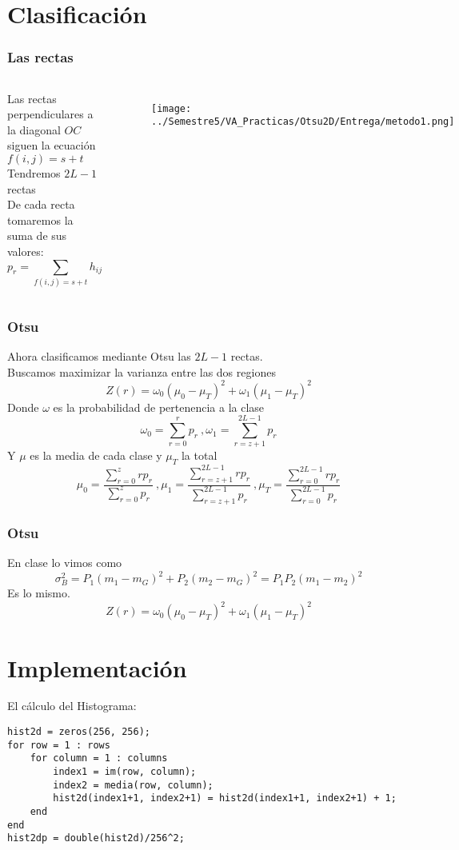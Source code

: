 \documentclass{beamer}
\begin{document}
\section{Clasificación}
\begin{frame}
\frametitle{Las rectas}
\begin{columns}[t] %
Las rectas perpendiculares a la diagonal $OC$ siguen la ecuación $f(i,j)=s+t$\\
Tendremos $2L-1$ rectas\\
De cada recta tomaremos la suma de sus valores:
$$p_r = \sum_{f(i,j)=s+t}{h_{ij}}$$
\begin{figure}
\texttt{[image: ../Semestre5/VA\_Practicas/Otsu2D/Entrega/metodo1.png]}
\end{figure}
\end{columns}
\end{frame}

\begin{frame}
\frametitle{Otsu}
Ahora clasificamos mediante Otsu las $2L-1$ rectas.\\
Buscamos maximizar la varianza entre las dos regiones $$Z(r)= \omega_0(\mu_0-\mu_T)^2+\omega_1(\mu_1-\mu_T)^2$$
Donde $\omega$ es la probabilidad de pertenencia a la clase $$\omega_0=\sum_{r=0}^rp_r\ ,\omega_1=\sum_{r=z+1}^{2L-1}p_r$$
Y $\mu$ es la media de cada clase y $\mu_{T}$ la total
$$ \mu_0 = \frac{\sum_{r=0}^zrp_r}{\sum_{r=0}^zp_r}\ , \mu_1 = \frac{\sum_{r=z+1}^{2L-1}rp_r}{\sum_{r=z+1}^{2L-1}p_r}\ , \mu_T = \frac{\sum_{r=0}^{2L-1}rp_r}{\sum_{r=0}^{2L-1}p_r}$$
\end{frame}

\begin{frame}
\frametitle{Otsu}
En clase lo vimos como 
$$\sigma_B^2=P_1(m_1-m_G)^2+P_2(m_2-m_G)^2=P_1P_2(m_1-m_2)^2$$
Es lo mismo.
$$Z(r)= \omega_0(\mu_0-\mu_T)^2+\omega_1(\mu_1-\mu_T)^2$$
\end{frame}

\section{Implementación}

\begin{frame}[fragile]
El cálculo del Histograma:
\begin{lstlisting}
hist2d = zeros(256, 256);   
for row = 1 : rows
    for column = 1 : columns	
        index1 = im(row, column);
        index2 = media(row, column);
        hist2d(index1+1, index2+1) = hist2d(index1+1, index2+1) + 1;
    end
end
hist2dp = double(hist2d)/256^2;
\end{lstlisting}

\end{frame}
\end{document}
